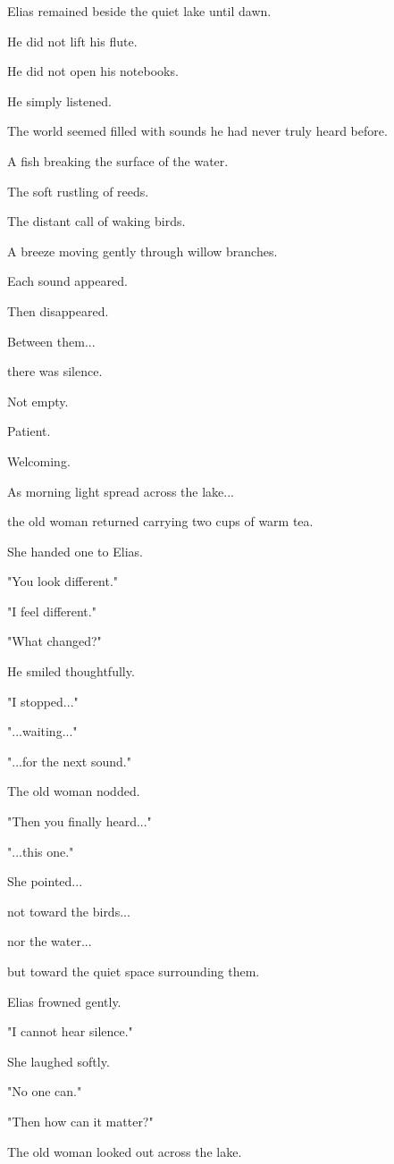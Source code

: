 \documentclass[12pt,openany]{book}
\begin{document}
Elias remained beside the quiet lake until dawn.

He did not lift his flute.

He did not open his notebooks.

He simply listened.

The world seemed filled with sounds he had never truly heard before.

A fish breaking the surface of the water.

The soft rustling of reeds.

The distant call of waking birds.

A breeze moving gently through willow branches.

Each sound appeared.

Then disappeared.

Between them...

there was silence.

Not empty.

Patient.

Welcoming.

As morning light spread across the lake...

the old woman returned carrying two cups of warm tea.

She handed one to Elias.

"You look different."

"I feel different."

"What changed?"

He smiled thoughtfully.

"I stopped..."

"...waiting..."

"...for the next sound."

The old woman nodded.

"Then you finally heard..."

"...this one."

She pointed...

not toward the birds...

nor the water...

but toward the quiet space surrounding them.

Elias frowned gently.

"I cannot hear silence."

She laughed softly.

"No one can."

"Then how can it matter?"

The old woman looked out across the lake.
\end{document}
